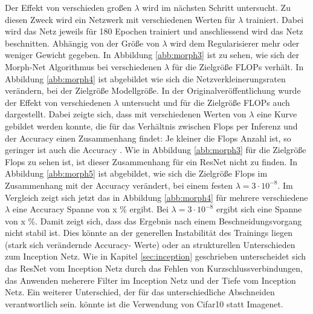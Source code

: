 Der Effekt von verschieden großen $\lambda$ wird im nächsten Schritt untersucht. Zu diesen Zweck wird ein Netzwerk mit verschiedenen Werten für $\lambda$ trainiert. Dabei wird das Netz jeweils für 180 Epochen trainiert und anschliessend wird das Netz beschnitten. Abhängig von der Größe von $\lambda$ wird dem Regularisierer mehr oder weniger Gewicht gegeben. In Abbildung \ref{abb:morph3} ist zu sehen, wie sich der Morph-Net Algorithmus bei verschiedenen $\lambda$ für die Zielgröße FLOPs verhält. In Abbildung \ref{abb:morph4} ist abgebildet wie sich die Netzverkleinerungsraten verändern, bei der Zielgröße Modellgröße. In der Originalveröffentlichung wurde der Effekt von verschiedenen $\lambda$ untersucht und für die Zielgröße FLOPs auch dargestellt. Dabei zeigte sich, dass mit verschiedenen Werten von $\lambda$ eine Kurve gebildet werden konnte, die für das Verhältnis zwischen Flops per Inferenz und der Accuracy einen Zusammenhang findet: Je kleiner die Flops Anzahl ist, so geringer ist auch die Accuracy \cite{morphnet}. Wie in Abbildung \ref{abb:morph3} für die Zielgröße Flops zu sehen ist, ist dieser Zusammenhang für ein ResNet nicht zu finden. In Abbildung \ref{abb:morph5} ist abgebildet, wie sich die Zielgröße Flops im Zusammenhang mit der Accuracy verändert, bei einem festen $\lambda = 3 \cdot 10^{-8}$. Im Vergleich zeigt sich jetzt das in Abbildung \ref{abb:morph4} für mehrere verschiedene $\lambda$ eine Accuracy Spanne von x \% ergibt. Bei $\lambda = 3 \cdot 10^{-8}$ ergibt sich eine Spanne von x \%. Damit zeigt sich, dass das Ergebnis nach einem Beschneidungsvorgang nicht stabil ist. Dies könnte an der generellen Instabilität des Trainings liegen (stark sich verändernde Accuracy- Werte) oder an strukturellen Unterschieden zum Inception Netz. Wie in Kapitel \ref{sec:inception} geschrieben unterscheidet sich das ResNet vom Inception Netz durch das Fehlen von Kurzschlussverbindungen, das Anwenden meherere Filter im Inception Netz und der Tiefe vom Inception Netz. Ein weiterer Unterschied, der für das unterschiedliche Abschneiden verantwortlich sein. könnte ist die Verwendung von Cifar10 statt Imagenet.




